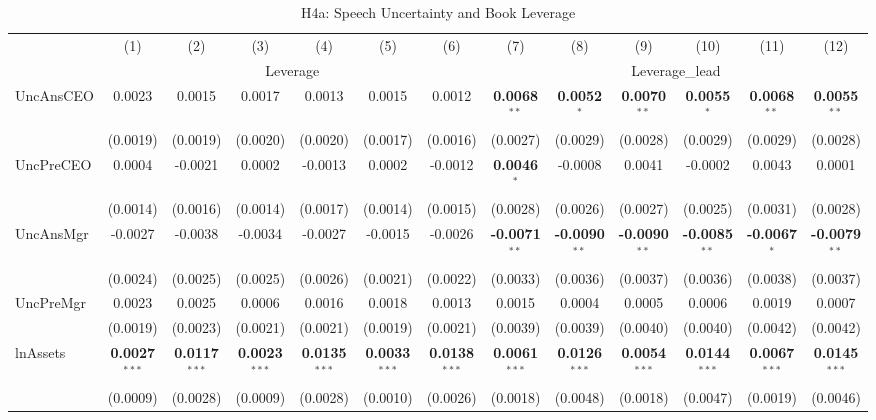 \documentclass[11pt,a4paper]{article}
\begin{document}
\clearpage
\begin{table}[htbp]
\centering
\caption{H4a: Speech Uncertainty and Book Leverage}
\label{tab:h4a}
\scriptsize
\begin{tabular}{lcccccccccccc}
\toprule
 & (1) & (2) & (3) & (4) & (5) & (6) & (7) & (8) & (9) & (10) & (11) & (12) \\
 & \multicolumn{6}{c}{Leverage} & \multicolumn{6}{c}{Leverage\_lead} \\
\cmidrule(lr){2-7} \cmidrule(lr){8-13}
\midrule
UncAnsCEO & 0.0023 & 0.0015 & 0.0017 & 0.0013 & 0.0015 & 0.0012 & \textbf{0.0068}$^{**}$ & \textbf{0.0052}$^{*}$ & \textbf{0.0070}$^{**}$ & \textbf{0.0055}$^{*}$ & \textbf{0.0068}$^{**}$ & \textbf{0.0055}$^{**}$ \\
 & (0.0019) & (0.0019) & (0.0020) & (0.0020) & (0.0017) & (0.0016) & (0.0027) & (0.0029) & (0.0028) & (0.0029) & (0.0029) & (0.0028) \\
UncPreCEO & 0.0004 & -0.0021 & 0.0002 & -0.0013 & 0.0002 & -0.0012 & \textbf{0.0046}$^{*}$ & -0.0008 & 0.0041 & -0.0002 & 0.0043 & 0.0001 \\
 & (0.0014) & (0.0016) & (0.0014) & (0.0017) & (0.0014) & (0.0015) & (0.0028) & (0.0026) & (0.0027) & (0.0025) & (0.0031) & (0.0028) \\
UncAnsMgr & -0.0027 & -0.0038 & -0.0034 & -0.0027 & -0.0015 & -0.0026 & \textbf{-0.0071}$^{**}$ & \textbf{-0.0090}$^{**}$ & \textbf{-0.0090}$^{**}$ & \textbf{-0.0085}$^{**}$ & \textbf{-0.0067}$^{*}$ & \textbf{-0.0079}$^{**}$ \\
 & (0.0024) & (0.0025) & (0.0025) & (0.0026) & (0.0021) & (0.0022) & (0.0033) & (0.0036) & (0.0037) & (0.0036) & (0.0038) & (0.0037) \\
UncPreMgr & 0.0023 & 0.0025 & 0.0006 & 0.0016 & 0.0018 & 0.0013 & 0.0015 & 0.0004 & 0.0005 & 0.0006 & 0.0019 & 0.0007 \\
 & (0.0019) & (0.0023) & (0.0021) & (0.0021) & (0.0019) & (0.0021) & (0.0039) & (0.0039) & (0.0040) & (0.0040) & (0.0042) & (0.0042) \\
\midrule
lnAssets & \textbf{0.0027}$^{***}$ & \textbf{0.0117}$^{***}$ & \textbf{0.0023}$^{***}$ & \textbf{0.0135}$^{***}$ & \textbf{0.0033}$^{***}$ & \textbf{0.0138}$^{***}$ & \textbf{0.0061}$^{***}$ & \textbf{0.0126}$^{***}$ & \textbf{0.0054}$^{***}$ & \textbf{0.0144}$^{***}$ & \textbf{0.0067}$^{***}$ & \textbf{0.0145}$^{***}$ \\
 & (0.0009) & (0.0028) & (0.0009) & (0.0028) & (0.0010) & (0.0026) & (0.0018) & (0.0048) & (0.0018) & (0.0047) & (0.0019) & (0.0046) \\

\end{tabular}
\end{table}
\end{document}
